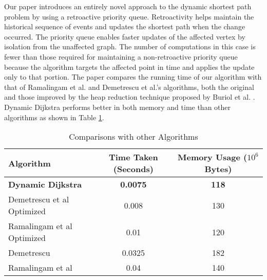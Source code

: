 \documentclass[12pt]{article}
\begin{document}
Our paper introduces an entirely novel approach to the dynamic shortest path problem by using a retroactive priority queue. Retroactivity helps maintain the historical sequence of events and updates the shortest path when the change occurred. The priority queue enables faster updates of the affected vertex by isolation from the unaffected graph. The number of computations in this case is fewer than those required for maintaining a non-retroactive priority queue because the algorithm targets the affected point in time and applies the update only to that portion. The paper compares the running time of our algorithm with that of Ramalingam et al. and Demetrescu et al.'s algorithms, both the original and those improved by the heap reduction technique proposed by Buriol et al. \cite{buriol2003speeding}. Dynamic Dijkstra performs better in both memory and time than other algorithms as shown in Table \ref{tab:comparisons}.

\begin{table}[H]
    \centering
    \label{tab:comparisons}
    \begin{tabular}{|l|c|c|}
        \hline
        \textbf{Algorithm} & \textbf{Time Taken (Seconds)} & \textbf{Memory Usage ($10^6$ Bytes)} \\
        \hline        
        \textbf{Dynamic Dijkstra} & \textbf{0.0075} & \textbf{118}\\
        Demetrescu et al Optimized  & 0.008 & 130  \\
        Ramalingam et al Optimized & 0.01 & 120  \\
        Demetrescu  & 0.0325 & 182 \\
        Ramalingam et al & 0.04 & 140\\
        
        \hline
    \end{tabular}
        \caption{Comparisons with other Algorithms}

\end{table}
\\
\end{document}
